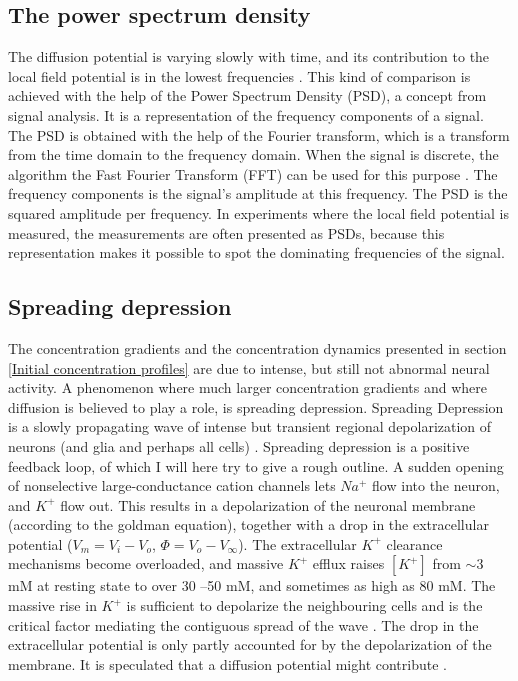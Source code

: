 \documentclass{article}
\begin{document}
\subsection{The power spectrum density}\label{PSD}
The diffusion potential is varying slowly with time, and its contribution to the local field potential is in the lowest frequencies \cite{Halnes2016}. This kind of comparison is achieved with the help of the Power Spectrum Density (PSD), a concept from signal analysis. It is a representation of the frequency components of a signal. The PSD is obtained with the help of the Fourier transform, which is a transform from the time domain to the frequency domain. When the signal is discrete, the algorithm the Fast Fourier Transform (FFT) can be used for this purpose \cite{wikipediaFFT}. The frequency components is the signal's amplitude at this frequency.  The PSD is the squared amplitude per frequency. In experiments where the local field potential is measured, the measurements are often presented as PSDs, because this representation makes it possible to spot the dominating frequencies of the signal.

\subsection{Spreading depression}\label{SD}
The concentration gradients and the concentration dynamics presented in section \ref{Initial concentration profiles} are due to intense, but still not abnormal neural activity. A phenomenon where much larger concentration gradients and where diffusion is believed to play a role, is spreading depression. Spreading Depression is a slowly propagating wave of intense but transient
regional depolarization of neurons (and glia and perhaps all cells) \cite{Ataya2015}. Spreading depression is a positive feedback loop, of which I will here try to give a rough outline. A sudden opening of nonselective large-conductance cation channels lets $Na^+$ flow into the neuron, and $K^+$ flow out. This results in a depolarization of the neuronal membrane (according to the goldman equation), together with a drop in the extracellular potential ($V_m=V_i-V_o$, $\Phi = V_o - V_{\infty}$). The extracellular $K^+$ clearance mechanisms become overloaded, and massive $K^+$ efflux raises $[K^+]$ from $ \sim 3$ mM at resting state
to over 30 –50 mM, and sometimes as
high as 80 mM. The massive rise in $K^+$ is sufficient to depolarize the neighbouring cells and is the critical factor mediating the contiguous spread of
the wave \cite{Ataya2015}. The drop in the extracellular potential is only partly accounted for by the depolarization of the membrane. It is speculated that a diffusion potential might contribute \cite{Herreras1993}. 
\end{document}
